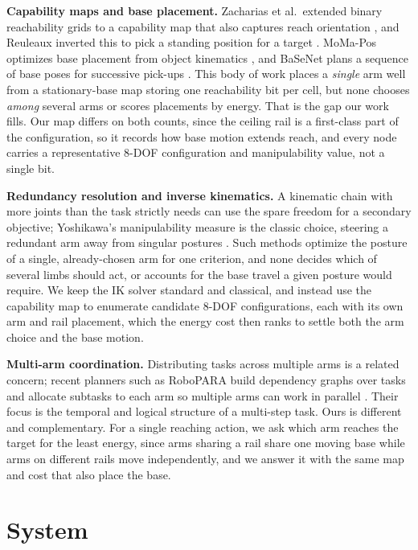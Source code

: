 \documentclass[conference]{IEEEtran}
\begin{document}
\noindent\textbf{Capability maps and base placement.}
Zacharias et al.\ extended binary reachability grids to a
capability map that also captures reach orientation \cite{Zacharias2007}, and
Reuleaux inverted this to pick a standing position for a target
\cite{Makhal2018}. MoMa-Pos optimizes base placement from object kinematics
\cite{MoMaPos2024}, and BaSeNet plans a sequence of base poses for successive
pick-ups \cite{BaSeNet2024}. This body of work places a \emph{single} arm well
from a stationary-base map storing one reachability bit per cell, but none
chooses \emph{among} several arms or scores placements by energy. That is the gap our
work fills. Our map differs on both counts, since the ceiling rail is a first-class
part of the configuration, so it records how base motion extends reach, and
every node carries a representative 8-DOF configuration and manipulability
value, not a single bit.

\noindent\textbf{Redundancy resolution and inverse kinematics.}
A kinematic chain with more joints than the task strictly needs can use
the spare freedom for a secondary objective; Yoshikawa's manipulability measure is
the classic choice, steering a redundant arm away from singular postures
\cite{Yoshikawa1985}. Such methods optimize the posture of a single, already-chosen
arm for one criterion, and none decides which of several limbs should act, or accounts
for the base travel a given posture would require. We keep the IK solver standard and
classical, and instead use the capability map to enumerate candidate 8-DOF
configurations, each with its own arm and rail placement, which the energy cost then
ranks to settle both the arm choice and the base motion.

\noindent\textbf{Multi-arm coordination.}
Distributing tasks across multiple arms is a related concern; recent
planners such as RoboPARA build dependency graphs over tasks and
allocate subtasks to each arm so multiple arms can work in parallel
\cite{RoboPARA2026}. Their focus is the temporal and logical structure of
a multi-step task. Ours is different and complementary. For a single reaching action,
we ask which arm reaches the target for the least energy, since arms sharing a rail share
one moving base while arms on different rails move independently, and we answer it
with the same map and cost that also place the base.

\section{System}
\end{document}
